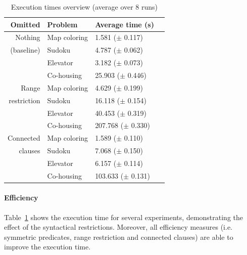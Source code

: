 \documentclass[letterpaper]{article}
\theoremstyle{definition}
\begin{document}
\begin{table}
  \caption{Execution times overview (average over 8 runs)}
  \begin{tabularx}{\linewidth}{rl|ll}

\textbf{Omitted}  & \textbf{Problem}    & \textbf{Average time (s)} \\ %
\toprule
Nothing           & Map coloring        & 1.581   ($\pm$ 0.117)     \\ %
   (baseline)     & Sudoku              & 4.787   ($\pm$ 0.062)     \\ %
                  & Elevator            & 3.182   ($\pm$ 0.073)     \\ %
                  & Co-housing          & 25.903  ($\pm$ 0.446)     \\ %
\midrule
Range             & Map coloring        & 4.629   ($\pm$ 0.199)     \\ %
restriction       & Sudoku              & 16.118  ($\pm$ 0.154)     \\ %
                  & Elevator            & 40.453  ($\pm$ 0.319)     \\ %
                  & Co-housing          & 207.768 ($\pm$ 0.330)     \\ %
\midrule
Connected         & Map coloring        & 1.589   ($\pm$ 0.110)     \\ %
    clauses       & Sudoku              & 7.068   ($\pm$ 0.150)     \\ %
                  & Elevator            & 6.157   ($\pm$ 0.114)     \\ %
                  & Co-housing          & 103.633 ($\pm$ 0.131)     \\ %
  \end{tabularx}
  \label{tbl:uitvoering}
\end{table}

\paragraph{Efficiency}
Table~\ref{tbl:uitvoering} shows the execution time for several experiments, demonstrating the effect of the syntactical restrictions.
Moreover, all efficiency measures (i.e. symmetric predicates, range restriction and connected clauses) are able to improve the execution time.
\end{document}
